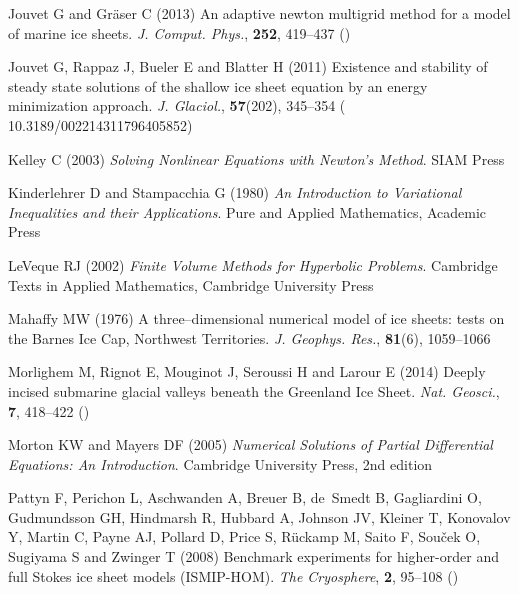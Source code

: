 \documentclass[twocolumn,letterpaper]{igs}
\begin{document}
\begin{thebibliography}{42}
Jouvet G and Gr{\"a}ser C (2013) An adaptive newton multigrid method for a
  model of marine ice sheets. \emph{J. Comput. Phys.}, \textbf{252}, 419--437
  ()

Jouvet G, Rappaz J, Bueler E and Blatter H (2011) Existence and stability of
  steady state solutions of the shallow ice sheet equation by an energy
  minimization approach. \emph{J. Glaciol.}, \textbf{57}(202), 345--354 (\doi
  {10.3189/002214311796405852})

Kelley C (2003) \emph{Solving {N}onlinear {E}quations with {N}ewton's
  {M}ethod}. SIAM Press

Kinderlehrer D and Stampacchia G (1980) \emph{An {I}ntroduction to
  {V}ariational {I}nequalities and their {A}pplications}. Pure and Applied
  Mathematics, Academic Press

LeVeque RJ (2002) \emph{Finite Volume Methods for Hyperbolic Problems}.
  Cambridge Texts in Applied Mathematics, Cambridge University Press

Mahaffy MW (1976) A three--dimensional numerical model of ice sheets: tests on
  the {B}arnes {I}ce {C}ap, {N}orthwest {T}erritories. \emph{J. Geophys. Res.},
  \textbf{81}(6), 1059--1066

Morlighem M, Rignot E, Mouginot J, Seroussi H and Larour E (2014) Deeply
  incised submarine glacial valleys beneath the {Greenland Ice Sheet}.
  \emph{Nat. Geosci.}, \textbf{7}, 418--422 ()

Morton KW and Mayers DF (2005) \emph{Numerical {S}olutions of {P}artial
  {D}ifferential {E}quations: {A}n {I}ntroduction}. Cambridge University Press,
  2nd edition

Pattyn F, Perichon L, Aschwanden A, Breuer B, de~Smedt B, Gagliardini O,
  Gudmundsson GH, Hindmarsh R, Hubbard A, Johnson JV, Kleiner T, Konovalov Y,
  Martin C, Payne AJ, Pollard D, Price S, R\"uckamp M, Saito F, Sou\v{c}ek O,
  Sugiyama S and Zwinger T (2008) Benchmark experiments for higher-order and
  full {S}tokes ice sheet models ({ISMIP-HOM}). \emph{The Cryosphere},
  \textbf{2}, 95--108 ()


\end{thebibliography}
\end{document}
